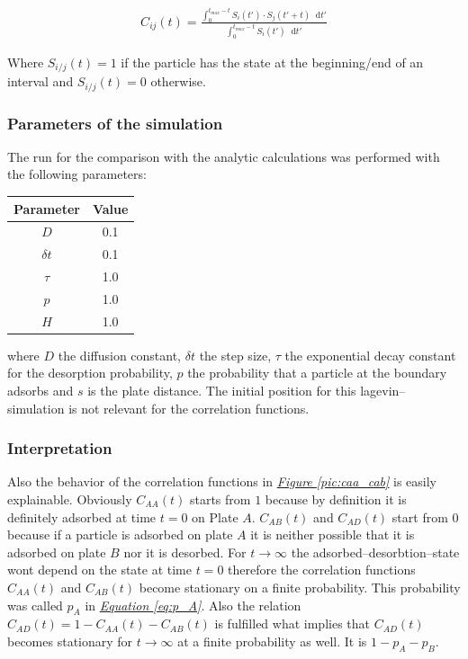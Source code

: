 \documentclass[a4paper, parskip=half]{scrartcl}
\newcommand{\diff}{\mathop{}\!\mathrm{d}}
\newcommand{\myFigRef}[1]{\textit{\hyperref[#1]{Figure \ref*{#1}}}}
\newcommand{\myEqRef}[1]{\textit{\hyperref[eq:#1]{Equation \ref*{eq:#1}}}}
\begin{document}
\begin{align}
  C_{ij}(t) = \frac{\int_0^{t_{max}-t} S_i(t') \cdot S_j(t' + t) \diff t'}{\int_0^{t_{max}-t} S_i(t') \diff t'}
\end{align}

Where $S_{i/j}(t) = 1$ if the particle has the state at the beginning/end of an interval and $S_{i/j}(t) = 0$ otherwise.

\subsubsection{Parameters of the simulation}
The run for the comparison with the analytic calculations was performed with the following parameters:
\begin{center}
\begin{tabular}{c|c}
Parameter & Value \\\hline
$D$ & 0.1 \\
$\delta t$ & 0.1 \\
$\tau$ & 1.0 \\
$p$ & 1.0 \\
$H$ & 1.0
\end{tabular}
\end{center}

where $D$ the diffusion constant, $\delta t$ the step size, $\tau$ the exponential decay constant for the desorption probability, $p$ the probability that a particle at the boundary adsorbs and $s$ is the plate distance. The initial position for this lagevin--simulation is not relevant for the correlation functions. 

\subsubsection{Interpretation}\label{interpretation}

Also the behavior of the correlation functions in \myFigRef{pic:caa_cab} is easily explainable. Obviously $C_{AA}(t)$ starts from $1$ because by definition it is definitely adsorbed at time $t=0$ on Plate $A$. $C_{AB}(t)$ and $C_{AD}(t)$ start from $0$ because if a particle is adsorbed on plate $A$ it is neither possible that it is adsorbed on plate $B$ nor it is desorbed. For $t \rightarrow \infty$ the adsorbed--desorbtion--state wont depend on the state at time $t = 0$ therefore the correlation functions $C_{AA}(t)$ and $C_{AB}(t)$ become stationary on a finite probability. This probability was called $p_A$ in \myEqRef{p_A}. Also the relation $C_{AD}(t) = 1 - C_{AA}(t) - C_{AB}(t)$ is fulfilled what implies that $C_{AD}(t)$ becomes stationary for $t \rightarrow \infty$ at a finite probability as well. It is $1 - p_A - p_B$.
\end{document}
